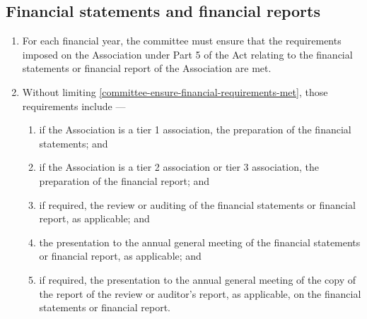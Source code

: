\documentclass[../constitution.tex]{subfiles}
\begin{document}
\hypertarget{financial-statements-and-financial-reports}{%
\subsection{Financial statements and financial reports}\label{financial-statements-and-financial-reports}}

\begin{enumerate}

\item For each financial year, the committee must ensure that the requirements imposed on the Association under Part 5 of the Act relating to the financial statements or financial report of the Association are met. \label{committee-ensure-financial-requirements-met}
\item Without limiting  \ref{committee-ensure-financial-requirements-met}, those requirements include ---

  \begin{enumerate}
  
  \item if the Association is a tier 1 association, the preparation of the financial statements; and
  \item if the Association is a tier 2 association or tier 3 association, the preparation of the financial report; and
  \item if required, the review or auditing of the financial statements or financial report, as applicable; and
  \item the presentation to the annual general meeting of the financial statements or financial report, as applicable; and
  \item if required, the presentation to the annual general meeting of the copy of the report of the review or auditor's report, as applicable, on the financial statements or financial report.
  \end{enumerate}
\end{enumerate}

\end{document}
